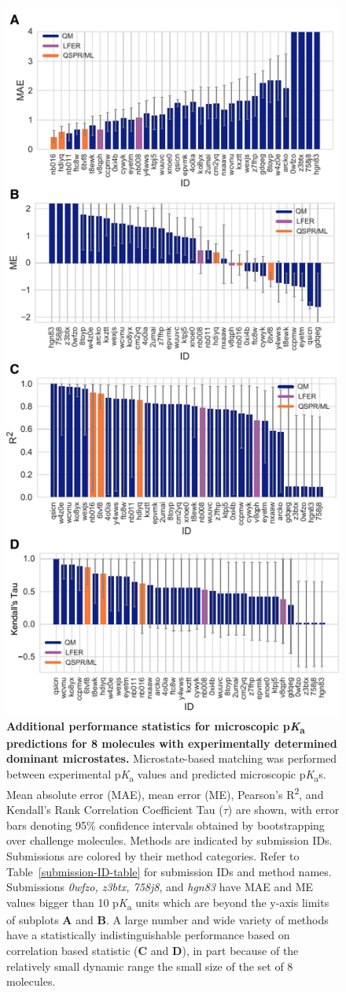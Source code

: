 \documentclass[9pt,lineno,final]{elife}
\newcommand{\pKa}{p\textit{K}\textsubscript{a}}
\begin{document}
\begin{figure}
\centering
\includegraphics[width=0.5\linewidth]{figures/typeI_statistics.pdf}
\caption{{\bf Additional performance statistics for microscopic \pKa{} predictions for 8 molecules with experimentally determined dominant microstates.} 
Microstate-based matching was performed between experimental \pKa{} values and predicted microscopic \pKa{}s. 
Mean absolute error (MAE), mean error (ME), Pearson’s R\textsuperscript{2}, and Kendall’s Rank Correlation Coefficient Tau ($\tau$) are shown, with error bars denoting 95\% confidence intervals obtained by bootstrapping over challenge molecules. Methods are indicated by submission IDs. Submissions are colored by their method categories. Refer to Table~\ref{submission-ID-table} for submission IDs and method names. Submissions \textit{0wfzo, z3btx, 758j8}, and \textit{hgn83} have MAE and ME values bigger than 10 \pKa{} units which are beyond the y-axis limits of subplots {\bf A} and {\bf B}. A large number and wide variety of methods have a statistically indistinguishable performance based on correlation based statistic ({\bf C} and {\bf D}), in part because of the relatively small dynamic range the small size of the set of 8 molecules.
}
\label{fig:typeI-statistics}
\end{figure}
\end{document}
